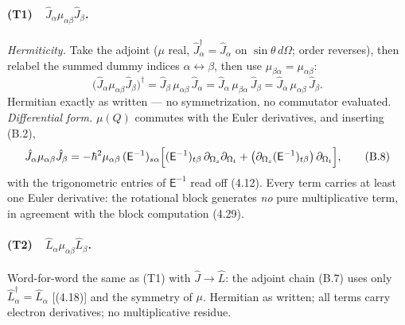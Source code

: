 \paragraph{(T1)\ \ $\hat J_\alpha\mu_{\alpha\beta}\hat J_\beta$.}
\emph{Hermiticity.} Take the adjoint ($\mu$ real, $\hat J_\alpha^\dagger=\hat J_\alpha$ on $\sin\theta\,d\Omega$; order reverses), then relabel the summed dummy indices $\alpha\leftrightarrow\beta$, then use $\mu_{\beta\alpha}=\mu_{\alpha\beta}$:
\begin{equation}
\bigl(\hat J_\alpha\mu_{\alpha\beta}\hat J_\beta\bigr)^{\dagger}
=\hat J_\beta\,\mu_{\alpha\beta}\,\hat J_\alpha
=\hat J_\alpha\,\mu_{\beta\alpha}\,\hat J_\beta
=\hat J_\alpha\,\mu_{\alpha\beta}\,\hat J_\beta . \tag{B.7}
\end{equation}
Hermitian exactly as written --- no symmetrization, no commutator evaluated. \emph{Differential form.} $\mu(Q)$ commutes with the Euler derivatives, and inserting (B.2),
\begin{equation}
\hat J_\alpha\mu_{\alpha\beta}\hat J_\beta
=-\hbar^{2}\mu_{\alpha\beta}\,(\mathsf E^{-1})_{s\alpha}\Bigl[(\mathsf E^{-1})_{t\beta}\,\partial_{\Omega_s}\partial_{\Omega_t}
+\bigl(\partial_{\Omega_s}(\mathsf E^{-1})_{t\beta}\bigr)\,\partial_{\Omega_t}\Bigr], \tag{B.8}
\end{equation}
with the trigonometric entries of $\mathsf E^{-1}$ read off (4.12). Every term carries at least one Euler derivative: the rotational block generates \emph{no} pure multiplicative term, in agreement with the block computation (4.29).

\paragraph{(T2)\ \ $\hat L_\alpha\mu_{\alpha\beta}\hat L_\beta$.}
Word-for-word the same as (T1) with $\hat J\to\hat L$: the adjoint chain (B.7) uses only $\hat L_\alpha^\dagger=\hat L_\alpha$ [(4.18)] and the symmetry of $\mu$. Hermitian as written; all terms carry electron derivatives; no multiplicative residue.

